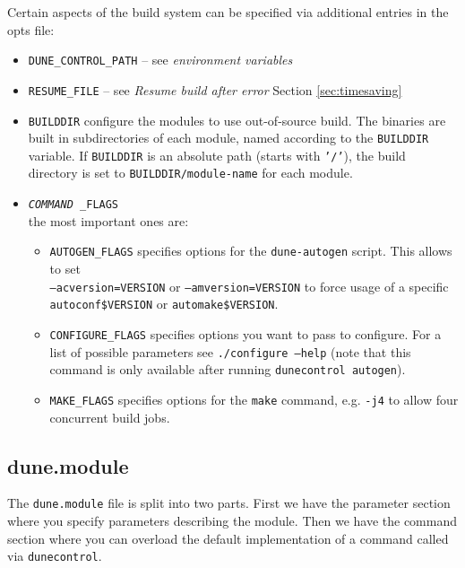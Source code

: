 \documentclass[11pt,a4paper,headinclude,footinclude,DIV16,normalheadings]{scrartcl}
\newcommand{\dunecontrol}{\texttt{dunecontrol}\xspace}
\newcommand{\dunemodule}{\texttt{dune.module}\xspace}
\begin{document}
Certain aspects of the build system can be specified via additional
entries in the opts file:

\begin{itemize}
\item \texttt{DUNE\_CONTROL\_PATH} -- see \emph{environment variables}
\item \texttt{RESUME\_FILE} -- see \emph{Resume build after error}
  Section \ref{sec:timesaving}
\item \texttt{BUILDDIR} configure the modules to use out-of-source
  build. The binaries are built in subdirectories of each module,
  named according to the \texttt{BUILDDIR} variable.
  If \texttt{BUILDDIR} is an absolute path (starts with \texttt{'\string/'}),
  the build directory is set to \texttt{BUILDDIR/module-name} for each module.
\item \texttt{\textit{COMMAND}\,\_FLAGS}\\ the most important ones are:
  \begin{itemize}
  \item \texttt{AUTOGEN\_FLAGS} specifies options for the
    \texttt{dune-autogen} script. This allows to set\\
    \texttt{--acversion=VERSION} or \texttt{--amversion=VERSION} to
    force usage of a specific\\ \texttt{autoconf\$VERSION} or 
    \texttt{automake\$VERSION}.
  \item \texttt{CONFIGURE\_FLAGS} specifies options you want to pass to
    configure. For a list of possible parameters see
    \texttt{./configure --help} (note that this command is only
    available after running \texttt{dunecontrol autogen}).
  \item \texttt{MAKE\_FLAGS} specifies options for the \texttt{make}
    command, e.g. \texttt{-j4} to allow four concurrent build jobs.
  \end{itemize}
\end{itemize}

\subsection{dune.module}\label{subsec::dune.module}

The \dunemodule file is split into two parts. First we have the
parameter section where you specify parameters describing the module.
Then we have the command section where you can overload the default
implementation of a command called via \dunecontrol.
\end{document}
